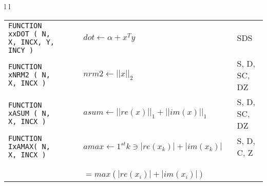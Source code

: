 \begin{tabular}{ l l }
\begin{tabular}{ l l l }
\verb+FUNCTION   xxDOT ( N,         X, INCX, Y, INCY )+ &
                       $ dot \leftarrow \alpha + x ^ {T} y $ & SDS \\
\verb+FUNCTION   xNRM2 ( N,         X, INCX )+ &
                       $ nrm2 \leftarrow || x || _ {2} $ & S, D, SC, DZ \\
\verb+FUNCTION   xASUM ( N,         X, INCX )+ &
                       $ asum \leftarrow || re( x ) || _ {1}  + || im( x ) || _ {1} $ & S, D, SC, DZ \\
\verb+FUNCTION   IxAMAX( N,         X, INCX )+ &
                       $ amax \leftarrow 1^{st} k \ni | re( x _ {k} ) |  + | im( x _ {k} ) | $ & S, D, C, Z \\
                       & \verb+            + $ = max( | re( x _ {i} ) |  + | im( x _ {i} ) | ) $ \\ 


\end{tabular}
\end{tabular}
